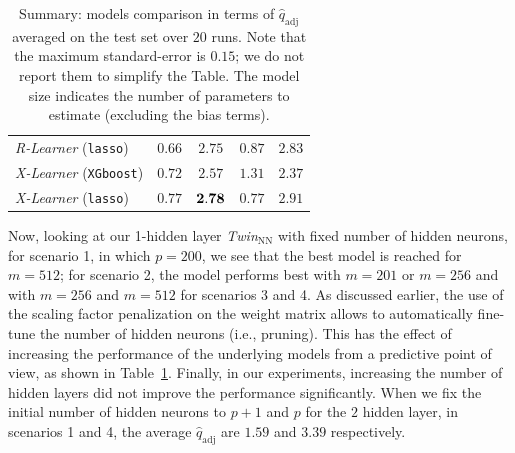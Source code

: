 \documentclass{article}
\def\qadj{\hat{q}_{\mathrm{adj}}}
\begin{document}
\begin{table}[!ht]
\begin{tabular}{l|cccc}
        {\it R-Learner }(\texttt{lasso}) \citep{NieWager2020Quasi} & $0.66$ & $2.75$ & $0.87$ & $2.83$ \\
        {\it X-Learner }(\texttt{XGboost}) \citep{kunzel2019metalearners} & $0.72$  & $2.57$ & $1.31$ & $2.37$ \\
        {\it X-Learner }(\texttt{lasso}) \citep{kunzel2019metalearners} & $0.77$ & $\bf 2.78$ & $0.77$ & $2.91$ \\
        \hline
    \end{tabular}
    \vspace{2mm}
    \caption{Summary: models comparison in terms of $\qadj$ averaged on the test set over $20$ runs. Note that the maximum standard-error is $0.15$; we do not report them to simplify the Table. The model size indicates the number of parameters to estimate (excluding the bias terms).}
    \label{tab:all_scenarios}
\end{table}

Now, looking at our 1-hidden layer {\it Twin$_{\mathrm{NN}}$} with fixed number of hidden neurons, for scenario 1, in which $p = 200$, we see that the best model is reached for $m = 512$; for scenario 2, the model performs best with $m = 201$ or $m = 256$ and with $m = 256$ and $m = 512$ for scenarios 3 and 4. %
As discussed earlier, the use of the scaling factor penalization on the weight matrix allows to automatically fine-tune the number of hidden neurons (i.e., pruning). This has the effect of increasing the performance of the underlying models from a predictive point of view, as shown in Table~\ref{tab:all_scenarios}. %
Finally, %
in our experiments, increasing the number of hidden layers did not improve the performance significantly. When we fix the initial number of hidden neurons to $p+1$ and $p$ for the $2$ hidden layer, in scenarios 1 and 4, the average $\qadj$ are $1.59$ and $3.39$ respectively.  %
\end{document}
